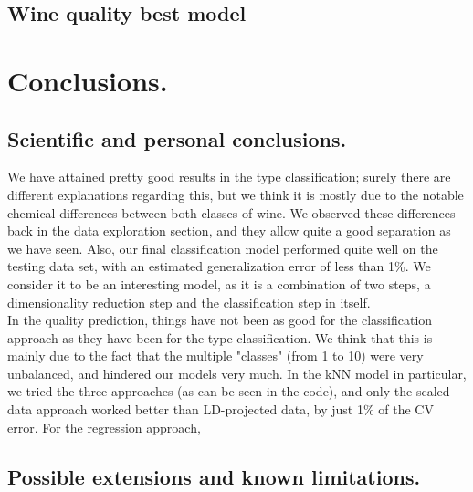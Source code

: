 \documentclass[10pt]{article}
\begin{document}
\subsection{Wine quality best model}

\section{Conclusions.}
\subsection{Scientific and personal conclusions.}
We have attained pretty good results in the type classification; surely there are different explanations regarding this, but we think it is mostly due to the notable chemical differences between both classes of wine. We observed these differences back in the data exploration section, and they allow quite a good separation as we have seen. Also, our final classification model performed quite well on the testing data set, with an estimated generalization error of less than 1\%. We consider it to be an interesting model, as it is a combination of two steps, a dimensionality reduction step and the classification step in itself.\\

In the quality prediction, things have not been as good for the classification approach as they have been for the type classification. We think that this is mainly due to the fact that the multiple "classes" (from 1 to 10) were very unbalanced, and hindered our models very much. In the kNN model in particular, we tried the three approaches (as can be seen in the code), and only the scaled data approach worked better than LD-projected data, by just 1\% of the CV error. For the regression approach,
\subsection{Possible extensions and known limitations.}
\end{document}
